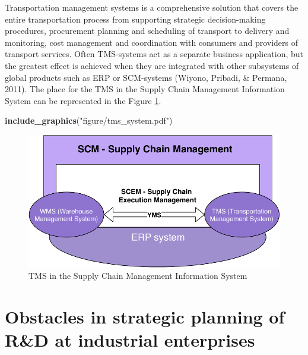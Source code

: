 \documentclass[12pt,twoside]{reedthesis}
\newenvironment{Shaded}{\begin{snugshade}}{\end{snugshade}}
\newcommand{\KeywordTok}[1]{\textcolor[rgb]{0.13,0.29,0.53}{\textbf{#1}}}
\newcommand{\NormalTok}[1]{#1}
\newcommand{\StringTok}[1]{\textcolor[rgb]{0.31,0.60,0.02}{#1}}
\begin{document}
Transportation management systems is a comprehensive solution that covers the entire transportation process from supporting strategic decision-making procedures, procurement planning and scheduling of transport to delivery and monitoring, cost management and coordination with consumers and providers of transport services. Often TMS-systems act as a separate business application, but the greatest effect is achieved when they are integrated with other subsystems of global products such as ERP or SCM-systems (Wiyono, Pribadi, \& Permana, 2011). The place for the TMS in the Supply Chain Management Information System can be represented in the Figure \ref{fig:tms}.
\begin{Shaded}
\begin{Highlighting}[]
\KeywordTok{include_graphics}\NormalTok{(}\StringTok{"figure/tms_system.pdf"}\NormalTok{)}
\end{Highlighting}
\end{Shaded}
\begin{figure}[h]

{\centering \includegraphics[width=0.9\linewidth,]{figure/tms_system} 

}

\caption{TMS in the Supply Chain Management Information System}\label{fig:tms}
\end{figure}
\hypertarget{obstacles-in-strategic-planning-of-rd-at-industrial-enterprises}{%
\chapter{Obstacles in strategic planning of R\&D at industrial enterprises}\label{obstacles-in-strategic-planning-of-rd-at-industrial-enterprises}}
\end{document}
